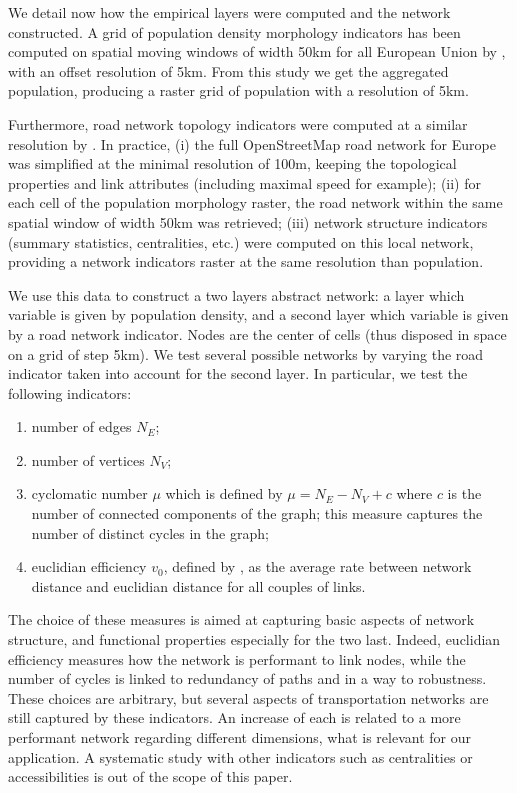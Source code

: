 \documentclass{jimis-en}
\begin{document}
We detail now how the empirical layers were computed and the network constructed. A grid of population density morphology indicators has been computed on spatial moving windows of width 50km for all European Union by \cite{raimbault2018calibration}, with an offset resolution of 5km. From this study we get the aggregated population, producing a raster grid of population with a resolution of 5km.

Furthermore, road network topology indicators were computed at a similar resolution by \cite{raimbault2018urban}. In practice, (i) the full OpenStreetMap road network for Europe was simplified at the minimal resolution of 100m, keeping the topological properties and link attributes (including maximal speed for example); (ii) for each cell of the population morphology raster, the road network within the same spatial window of width 50km was retrieved; (iii) network structure indicators (summary statistics, centralities, etc.) were computed on this local network, providing a network indicators raster at the same resolution than population.

We use this data to construct a two layers abstract network: a layer which variable is given by population density, and a second layer which variable is given by a road network indicator. Nodes are the center of cells (thus disposed in space on a grid of step 5km). We test several possible networks by varying the road indicator taken into account for the second layer. In particular, we test the following indicators:
\begin{enumerate}
	\item number of edges $N_E$;
	\item number of vertices $N_V$;
	\item cyclomatic number $\mu$ which is defined by $\mu = N_E - N_V + c$ where $c$ is the number of connected components of the graph; this measure captures the number of distinct cycles in the graph;
	\item euclidian efficiency $v_0$, defined by \cite{banos2012towards}, as the average rate between network distance and euclidian distance for all couples of links.
\end{enumerate}

The choice of these measures is aimed at capturing basic aspects of network structure, and functional properties especially for the two last. Indeed, euclidian efficiency measures how the network is performant to link nodes, while the number of cycles is linked to redundancy of paths and in a way to robustness. These choices are arbitrary, but several aspects of transportation networks are still captured by these indicators. An increase of each is related to a more performant network regarding different dimensions, what is relevant for our application. A systematic study with other indicators such as centralities or accessibilities is out of the scope of this paper.
\end{document}
